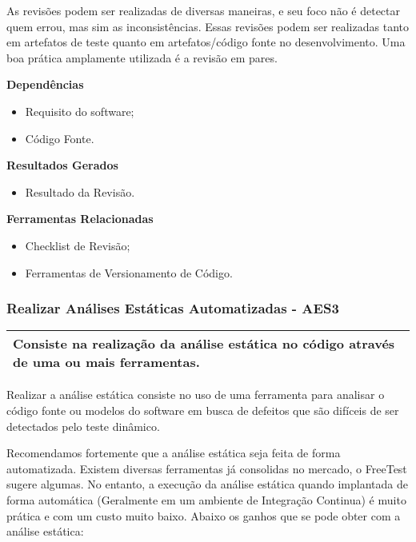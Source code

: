 As revisões podem ser realizadas de diversas maneiras, e seu foco não é detectar quem errou, mas sim as inconsistências. Essas revisões podem ser realizadas tanto em artefatos de teste quanto em artefatos/código fonte no desenvolvimento. Uma boa prática amplamente utilizada é a revisão em pares.

\textbf{ Dependências }
\begin{itemize}
    \item Requisito do software;
    \item Código Fonte.
\end{itemize}

\textbf{ Resultados Gerados }
\begin{itemize}
    \item Resultado da Revisão.
\end{itemize}

\textbf{ Ferramentas Relacionadas }
\begin{itemize}
    \item Checklist de Revisão;
    \item Ferramentas de Versionamento de Código.
\end{itemize}

\subsubsection{Realizar Análises Estáticas Automatizadas - AES3}
\label{sec:aes3}

\begin{table}[H]
\centering
\begin{tabular}{|p{130mm}|}
\hline
Consiste na realização da análise estática no código através de uma ou mais ferramentas. \\
\hline
\end{tabular}
\end{table}

Realizar a análise estática consiste no uso de uma ferramenta para analisar o código fonte ou modelos do software em busca de defeitos que são difíceis de ser detectados pelo teste dinâmico.

Recomendamos fortemente que a análise estática seja feita de forma automatizada. Existem diversas ferramentas já consolidas no mercado, o FreeTest sugere algumas. No entanto, a execução da análise estática quando implantada de forma automática (Geralmente em um ambiente de Integração Continua) é muito prática e com um custo muito baixo. Abaixo os ganhos que se pode obter com a análise estática:

